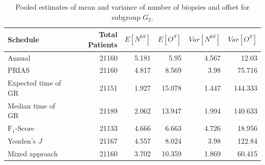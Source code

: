 \begin{table}[!htb]
\centering
\captionsetup{justification=centering}
\caption{Pooled estimates of mean and variance of number of biopsies and offset for subgroup $G_2$.}
\label{table : sim_study_pooled_estimates_G2}
\begin{tabular}{@{}lrrrrr@{}}
\toprule
Schedule           & Total Patients & $E[N^{bS}]$ & $E[O^{S}]$ & $Var[N^{bS}]$ & $Var[O^S]$ \\ \midrule
Annual              & 21160                  & 5.181           & 5.95                & 4.567          & 12.03              \\
PRIAS              & 21160                  & 4.817           & 8.569               & 3.98           & 75.716             \\
Expected time of GR & 21151                  & 1.927           & 15.078              & 1.447          & 144.333            \\
Median time of GR  & 21189                  & 2.062           & 13.947              & 1.994          & 140.633            \\
$\text{F}_1$-Score           & 21133                  & 4.666           & 6.663               & 4.726          & 18.956             \\
Youden's $J$             & 21167                  & 4.557           & 8.024               & 3.98           & 122.84            \\
Mixed approach     & 21160                  & 3.702           & 10.359              & 1.869          & 60.415             \\ \bottomrule
\end{tabular}
\end{table}

